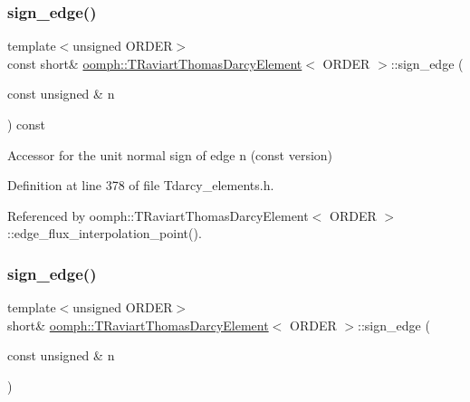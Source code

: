 \subsubsection{\texorpdfstring{sign\+\_\+edge()}{sign\_edge()}\hspace{0.1cm}{\footnotesize\ttfamily [1/2]}}
{\footnotesize\ttfamily template$<$unsigned O\+R\+D\+ER$>$ \\
const short\& \hyperlink{classoomph_1_1TRaviartThomasDarcyElement}{oomph\+::\+T\+Raviart\+Thomas\+Darcy\+Element}$<$ O\+R\+D\+ER $>$\+::sign\+\_\+edge (\begin{DoxyParamCaption}\item[{const unsigned \&}]{n }\end{DoxyParamCaption}) const\hspace{0.3cm}{\ttfamily [inline]}}



Accessor for the unit normal sign of edge n (const version) 



Definition at line 378 of file Tdarcy\+\_\+elements.\+h.



Referenced by oomph\+::\+T\+Raviart\+Thomas\+Darcy\+Element$<$ O\+R\+D\+E\+R $>$\+::edge\+\_\+flux\+\_\+interpolation\+\_\+point().

\mbox{\label{classoomph_1_1TRaviartThomasDarcyElement_a5f6c83af4ce8e8eed262eb91ed75a5e1}} 
\subsubsection{\texorpdfstring{sign\+\_\+edge()}{sign\_edge()}\hspace{0.1cm}{\footnotesize\ttfamily [2/2]}}
{\footnotesize\ttfamily template$<$unsigned O\+R\+D\+ER$>$ \\
short\& \hyperlink{classoomph_1_1TRaviartThomasDarcyElement}{oomph\+::\+T\+Raviart\+Thomas\+Darcy\+Element}$<$ O\+R\+D\+ER $>$\+::sign\+\_\+edge (\begin{DoxyParamCaption}\item[{const unsigned \&}]{n }\end{DoxyParamCaption})\hspace{0.3cm}{\ttfamily [inline]}}



